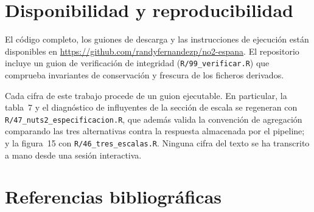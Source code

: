 \documentclass[11pt,a4paper]{article}
\begin{document}
\section{Disponibilidad y reproducibilidad}

El código completo, los guiones de descarga y las instrucciones de ejecución
están disponibles en \url{https://github.com/randyfernandezp/no2-espana}. El
repositorio incluye un guion de verificación de integridad
(\texttt{R/99\_verificar.R}) que comprueba invariantes de conservación y
frescura de los ficheros derivados.

Cada cifra de este trabajo procede de un guion ejecutable. En particular, la
tabla~7 y el diagnóstico de influyentes de la sección de escala se regeneran
con \texttt{R/47\_nuts2\_especificacion.R}, que además valida la convención de
agregación comparando las tres alternativas contra la respuesta almacenada por
el pipeline; y la figura~15 con \texttt{R/46\_tres\_escalas.R}. Ninguna cifra
del texto se ha transcrito a mano desde una sesión interactiva.

\section{Referencias bibliográficas}
\end{document}
